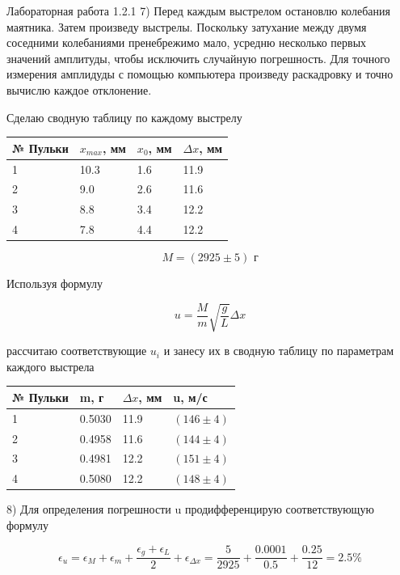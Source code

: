 \documentclass{astroedu-lab}
\begin{document}
\begin{problem}{\large Лабораторная работа 1.2.1}
7) Перед каждым выстрелом остановлю колебания маятника. Затем произведу выстрелы. Поскольку затухание между двумя соседними колебаниями пренебрежимо мало, усредню несколько первых значений амплитуды, чтобы исключить случайную погрешность. Для точного измерения амплидуды с помощью компьютера произведу раскадровку и точно вычислю каждое отклонение.

Сделаю сводную таблицу по каждому выстрелу

\begin{center}
\begin{tabular}[t]{|l|l|l|l|}
\hline
№ Пульки & $x_{max}$, мм & $x_0$, мм & $\Delta x$, мм \\
\hline
1 & 10.3 & 1.6 & 11.9 \\
2 & 9.0 & 2.6 & 11.6 \\
3 & 8.8 & 3.4 & 12.2 \\
4 & 7.8 & 4.4 & 12.2 \\
\hline
\end{tabular}
\end{center}

\begin{equation}
	M = (2925 \pm 5) \text{ г}
\end{equation}

Используя формулу

\begin{equation}
	u = \frac{M}{m}\sqrt{\frac{g}{L}} \Delta x
\end{equation}

рассчитаю соответствующие $u_i$ и занесу их в сводную таблицу по параметрам каждого выстрела

\begin{center}
\begin{tabular}[t]{|l|l|l|l|}
\hline
№ Пульки & m, г & $\Delta x$, мм & u, м/с \\
\hline
1 & 0.5030 & 11.9 & $(146 \pm 4)$ \\
2 & 0.4958 & 11.6 & $(144 \pm 4)$ \\
3 & 0.4981 & 12.2 & $(151 \pm 4)$ \\
4 & 0.5080 & 12.2 & $(148 \pm 4)$ \\
\hline
\end{tabular}
\end{center}

8) Для определения погрешности u продифференцирую соответствующую формулу

\begin{equation}
	\epsilon_u = \epsilon_M + \epsilon_m + \frac{\epsilon_g + \epsilon_L}{2} + \epsilon_{\Delta x} = \frac{5}{2925} + \frac{0.0001}{0.5} + \frac{0.25}{12} = 2.5\%
\end{equation}


\end{problem}
\end{document}
